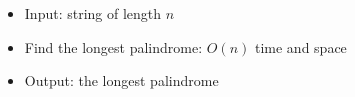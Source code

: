 \begin{itemize}
	\item Input: string of length $n$
	\item Find the longest palindrome: $O(n)$ time and space
	\item Output: the longest palindrome
\end{itemize}